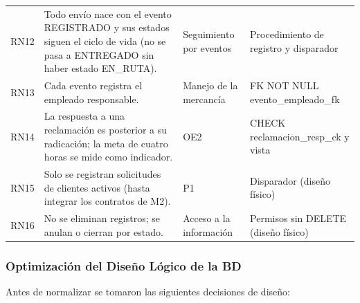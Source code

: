 {\begin{longtable}{L{1.0cm} L{6.6cm} L{2.6cm} L{4.2cm}}
RN12 & Todo envío nace con el evento REGISTRADO y sus estados siguen el ciclo de vida (no se pasa a ENTREGADO sin haber estado EN\_RUTA). & Seguimiento por eventos & Procedimiento de registro y disparador \\
RN13 & Cada evento registra el empleado responsable. & Manejo de la mercancía & FK NOT NULL evento\_empleado\_fk \\
RN14 & La respuesta a una reclamación es posterior a su radicación; la meta de cuatro horas se mide como indicador. & OE2 & CHECK reclamacion\_resp\_ck y vista \\
RN15 & Solo se registran solicitudes de clientes activos (hasta integrar los contratos de M2). & P1 & Disparador (diseño físico) \\
RN16 & No se eliminan registros; se anulan o cierran por estado. & Acceso a la información & Permisos sin DELETE (diseño físico) \\
\end{longtable}
\par}

\subsubsection{Optimización del Diseño Lógico de la BD}

Antes de normalizar se tomaron las siguientes decisiones de diseño:

